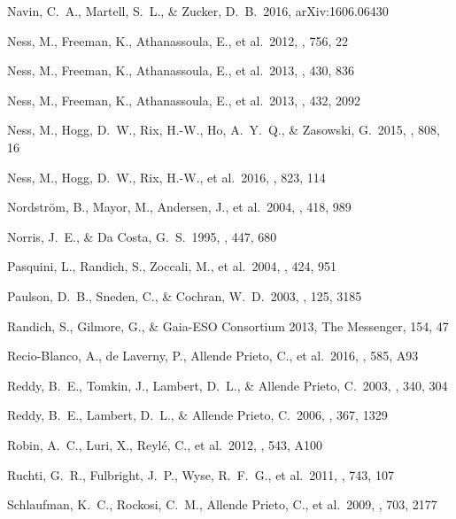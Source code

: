 \documentclass[preprint,trackchanges]{aastex}
\begin{document}
\begin{thebibliography}{dummy}
 Navin, C.~A., Martell, S.~L., \& Zucker, D.~B.\ 2016, arXiv:1606.06430 

 Ness, M., Freeman, K., Athanassoula, E., et al.\ 2012, \apj, 756, 22 

 Ness, M., Freeman, K., Athanassoula, E., et al.\ 2013, \mnras, 430, 836 

 Ness, M., Freeman, K., Athanassoula, E., et al.\ 2013, \mnras, 432, 2092 

 Ness, M., Hogg, D.~W., Rix, H.-W., Ho, A.~Y.~Q., \& Zasowski, G.\ 2015, \apj, 808, 16 

 Ness, M., Hogg, D.~W., Rix, H.-W., et al.\ 2016, \apj, 823, 114 

 Nordstr{\"o}m, B., Mayor, M., Andersen, J., et al.\ 2004, \aap, 418, 989 

 Norris, J.~E., \& Da Costa, G.~S.\ 1995, \apj, 447, 680 

 Pasquini, L., Randich, S., Zoccali, M., et al.\ 2004, \aap, 424, 951 

 Paulson, D.~B., Sneden, C., \& Cochran, W.~D.\ 2003, \aj, 125, 3185 

 Randich, S., Gilmore, G., \& Gaia-ESO Consortium 2013, The Messenger, 154, 47 

 Recio-Blanco, A., de Laverny, P., Allende Prieto, C., et al.\ 2016, \aap, 585, A93 

 Reddy, B.~E., Tomkin, J., Lambert, D.~L., \& Allende Prieto, C.\ 2003, \mnras, 340, 304 

 Reddy, B.~E., Lambert, D.~L., \& Allende Prieto, C.\ 2006, \mnras, 367, 1329 

 Robin, A.~C., Luri, X., Reyl{\'e}, C., et al.\ 2012, \aap, 543, A100 

 Ruchti, G.~R., Fulbright, J.~P., Wyse, R.~F.~G., et al.\ 2011, \apj, 743, 107 

 Schlaufman, K.~C., Rockosi, C.~M., Allende Prieto, C., et al.\ 2009, \apj, 703, 2177 


\end{thebibliography}
\end{document}
